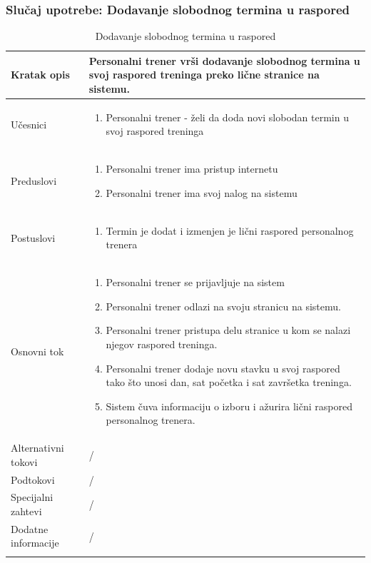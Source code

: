 \subsubsection{Slučaj upotrebe: Dodavanje slobodnog termina u raspored}
\begin{longtable}{| p{} | p{} |} 
\hline
    Kratak opis &  Personalni trener vrši dodavanje slobodnog termina u svoj raspored treninga preko lične stranice na sistemu.\\ 
\hline    
    Učesnici &
    \begin{enumerate}
        \item Personalni trener - želi da doda novi slobodan termin u svoj raspored treninga
    \end{enumerate}\\
\hline
   Preduslovi & 
   \begin{enumerate}
        \item Personalni trener ima pristup internetu
        \item Personalni trener ima svoj nalog na sistemu
    \end{enumerate}\\
\hline  
    Postuslovi &
    \begin{enumerate}
        \item Termin je dodat i izmenjen je lični raspored personalnog trenera
    \end{enumerate}\\
\hline
    Osnovni tok & 
    \begin{enumerate}
        \item Personalni trener se prijavljuje na sistem
        \item Personalni trener odlazi na svoju stranicu na sistemu.
        \item Personalni trener pristupa delu stranice u kom se nalazi njegov raspored treninga.
        \item Personalni trener dodaje novu stavku u svoj raspored tako što unosi dan, sat početka i sat završetka treninga.
        \item Sistem čuva informaciju o izboru i ažurira lični raspored personalnog trenera.
    \end{enumerate}\\
\hline
    Alternativni tokovi & /\\
\hline
    Podtokovi & /\\
\hline
    Specijalni zahtevi & /\\
\hline
    Dodatne informacije & /\\
\hline
\caption{Dodavanje slobodnog termina u raspored} %
\end{longtable}

